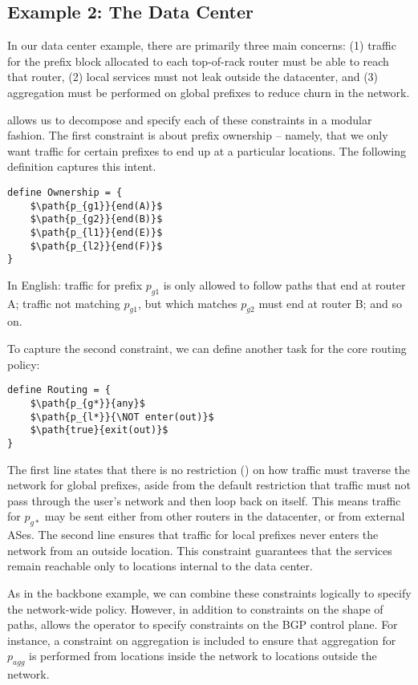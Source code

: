 \subsection{Example 2: The Data Center}

In our data center example,
there are primarily three main concerns:
(1) traffic for the prefix block allocated to each top-of-rack router must be able to reach that router,
(2) local services must not leak outside the datacenter, and
(3) aggregation must be performed on global prefixes to reduce churn
in the network.

\sysname allows us to decompose and specify each of these constraints in a modular fashion. The first constraint is about prefix ownership -- namely, that we only want traffic for certain prefixes to end up at a particular locations. The following definition captures this intent.

\begin{lstlisting}[mathescape=true]
define Ownership = {
    $\path{p_{g1}}{end(A)}$
    $\path{p_{g2}}{end(B)}$
    $\path{p_{l1}}{end(E)}$
    $\path{p_{l2}}{end(F)}$
}
\end{lstlisting}

In English: traffic for prefix $p_{g1}$ is only allowed to follow paths that
end at router A; traffic not matching $p_{g1}$, but which matches $p_{g2}$ must
end at router B; and so on.

To capture the second constraint, we can define another task for the core
routing policy:

\begin{lstlisting}[mathescape=true]
define Routing = {
    $\path{p_{g*}}{any}$
    $\path{p_{l*}}{\NOT enter(out)}$
    $\path{true}{exit(out)}$
}
\end{lstlisting}

The first line states that there is no restriction ()
on how traffic must
traverse the network for global prefixes, aside from the default restriction
that traffic must not pass through the user's network and then loop
back on itself. This means traffic for
$p_{g*}$ may be sent either from other routers in the datacenter, or
from external ASes. The second line ensures that traffic for local
prefixes never enters the network from an outside location. This constraint
guarantees that the services remain reachable only to locations
internal to the data center.

As in the backbone example, we can combine these constraints
logically to specify the network-wide policy.
However, in addition to constraints on the shape of paths,
\sysname allows the operator to specify constraints on the BGP control plane.
For instance, a constraint on aggregation is included to ensure that
aggregation for $p_{agg}$ is performed from locations inside the network
to locations outside the network. 

